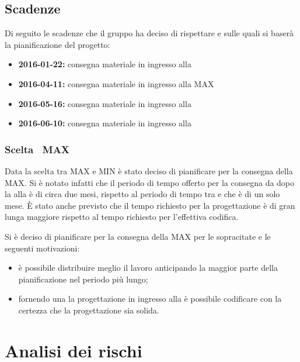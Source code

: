 \documentclass[12pt,a4paper]{article}
\begin{document}
\subsection{Scadenze}
Di seguito le scadenze che il gruppo \nomeGruppo{} ha deciso di rispettare e sulle quali si baserà la pianificazione del progetto:

\begin{itemize}
	\item \textbf{2016-01-22:} consegna materiale in ingresso alla \RR{}
	\item \textbf{2016-04-11:} consegna materiale in ingresso alla \RP{} MAX
	\item \textbf{2016-05-16:} consegna materiale in ingresso alla \RQ{}
	\item \textbf{2016-06-10:} consegna materiale in ingresso alla \RA{}
\end{itemize}

\subsubsection{Scelta \RP\ MAX}
\label{sec:scelta-rp}
Data la scelta tra \RP{} MAX e \RP{} MIN è stato deciso di pianificare per la consegna della \RP{} MAX.
Si è notato infatti che il periodo di tempo offerto per la consegna da dopo la \RR{} alla \RP{} è di circa due mesi, rispetto al periodo di tempo tra \RP{} e \RQ{} che è di un solo mese. È stato anche previsto che il tempo richiesto per la progettazione è di gran lunga maggiore rispetto al tempo richiesto per l'effettiva codifica.

Si è deciso di pianificare per la consegna della \RP{} MAX per le sopracitate e le seguenti motivazioni:
\begin{itemize}
    \item è possibile distribuire meglio il lavoro anticipando la maggior parte della pianificazione nel periodo più lungo;
    \item fornendo una la progettazione in ingresso alla \RP{} è possibile codificare con la certezza che la progettazione sia solida.
\end{itemize}

\newpage

\section{Analisi dei rischi}\label{Analisi dei rischi}
\end{document}
